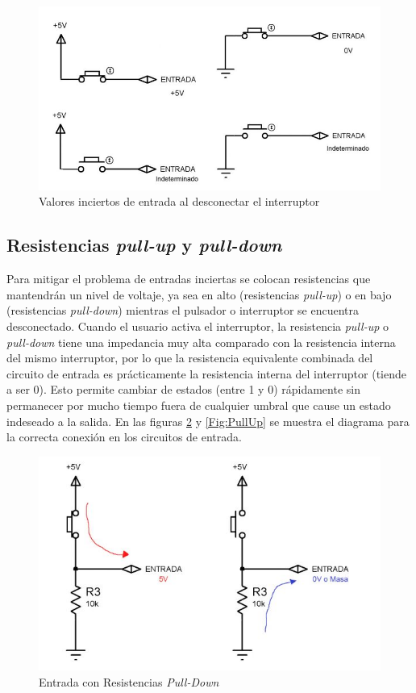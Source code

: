 \begin{figure}[H]
    \centering
    \includegraphics[scale=0.5]{images/noPull.jpg}
    \caption{Valores inciertos de entrada al desconectar el interruptor}
    \label{Fig:NoPull}
\end{figure}


\subsection{Resistencias \emph{pull-up} y \emph{pull-down}}
Para mitigar el problema de entradas inciertas se colocan resistencias que mantendrán un nivel de voltaje, ya sea en alto (resistencias \emph{pull-up}) o en bajo (resistencias \emph{pull-down}) mientras el pulsador
o interruptor se encuentra desconectado. Cuando el usuario activa el interruptor, la resistencia \emph{pull-up} o \emph{pull-down} tiene una impedancia muy alta comparado con la resistencia interna del mismo interruptor, por lo
que la resistencia equivalente combinada del circuito de entrada es prácticamente la resistencia interna del interruptor (tiende a ser 0). Esto permite cambiar de estados (entre 1 y 0) rápidamente sin permanecer por mucho
tiempo fuera de cualquier umbral que cause un estado indeseado a la salida. En las figuras \ref{Fig:PullDown} y \ref{Fig:PullUp} se muestra el diagrama para la correcta conexión en los circuitos de entrada.

\begin{figure}[H]
    \centering
    \includegraphics[scale=0.5]{images/pullDown.jpg}
    \caption{Entrada con Resistencias \emph{Pull-Down}}
    \label{Fig:PullDown}
\end{figure}

